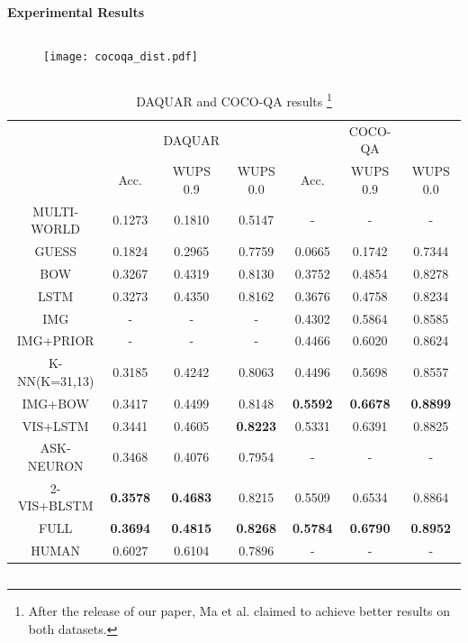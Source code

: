 \documentclass{beamer}
\renewcommand{\*}[1]{\textbf{#1}}
\begin{document}
\begin{frame}{}
\begin{columns}[T]
\begin{column}{0.32\linewidth}
\begin{block}{\bf{\large Experimental Results}}
\begin{columns}
\begin{column}{0.4\linewidth}
\begin{figure}
\texttt{[image: cocoqa\_dist.pdf]}
\end{figure}
\end{column}

\end{columns}

\vskip 0.4in
\vfill

\begin{table}[t!]
\caption{DAQUAR and COCO-QA results \footnote{After the release of our paper,
Ma et al. \cite{ma15} claimed to achieve better results on both datasets.}}
\small
\label{tab:daquar_results}
\begin{center}

\begin{tabular}{c | c c c | c c c}
\hline
            &          &  DAQUAR  &          &          &  COCO-QA &          \\
            &  Acc.    & WUPS 0.9 & WUPS 0.0 &  Acc.    & WUPS 0.9 & WUPS 0.0 \\
\hline         
MULTI-WORLD 
\cite{mal1} &  0.1273  &  0.1810  &  0.5147  &  -       &  -       &  -       \\
GUESS       &  0.1824  &  0.2965  &  0.7759  &  0.0665  &  0.1742  &  0.7344  \\
BOW         &  0.3267  &  0.4319  &  0.8130  &  0.3752  &  0.4854  &  0.8278  \\
LSTM        &  0.3273  &  0.4350  &  0.8162  &  0.3676  &  0.4758  &  0.8234  \\
IMG         &  -       &  -       &  -       &  0.4302  &  0.5864  &  0.8585  \\
IMG+PRIOR   &  -       &  -       &  -       &  0.4466  &  0.6020  &  0.8624  \\
K-NN(K=31,13)& 0.3185  &  0.4242  &  0.8063  &  0.4496  &  0.5698  &  0.8557  \\
IMG+BOW     &  0.3417  &  0.4499  &  0.8148  &\*{0.5592}&\*{0.6678}&\*{0.8899}\\
VIS+LSTM    &  0.3441  &  0.4605  &\*{0.8223}&  0.5331  &  0.6391  & 0.8825   \\
ASK-NEURON 
\cite{mal2} &  0.3468  &  0.4076  & 0.7954   &  -       &  -       &  -       \\
2-VIS+BLSTM &\*{0.3578}&\*{0.4683}& 0.8215   &  0.5509  &  0.6534  & 0.8864   \\
FULL        &\*{0.3694}&\*{0.4815}&\*{0.8268}&\*{0.5784}&\*{0.6790}&\*{0.8952}\\
\hline
HUMAN       &  0.6027  &  0.6104  &  0.7896  &  -       &  -       &  -       \\
\hline
\end{tabular}


\end{center}
\end{table}
\end{block}
\end{column}
\end{columns}
\end{frame}
\end{document}
